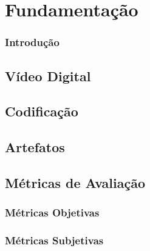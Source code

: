 \section{Fundamentação}

% 
\begin{frame}\frametitle{Introdução}
\end{frame}

\subsection{Vídeo Digital}
    \begin{frame}\frametitle{}
    \end{frame}

\subsection{Codificação}
    \begin{frame}\frametitle{}
    \end{frame}

\subsection{Artefatos}
    \begin{frame}\frametitle{}
    \end{frame}

\subsection{Métricas de Avaliação}
    \begin{frame}\frametitle{}
    \end{frame}
    
    \subsubsection{Métricas Objetivas}
        \begin{frame}\frametitle{}
        \end{frame}
        
    \subsubsection{Métricas Subjetivas}
        \begin{frame}\frametitle{}
        \end{frame}
    
